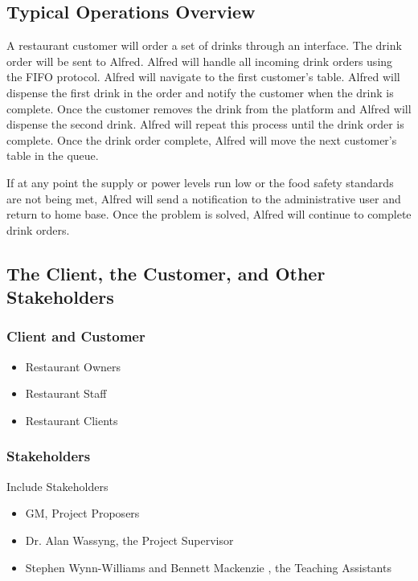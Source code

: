 \documentclass [11pt]{article}
\begin{document}
\subsection{Typical Operations Overview}
A restaurant customer will order a set of drinks through an interface. The drink order will be sent to Alfred. Alfred will handle all incoming drink orders using the FIFO protocol. Alfred will navigate to the first customer's table. Alfred will dispense the first drink in the order and notify the customer when the drink is complete. Once the customer removes the drink from the platform and Alfred will dispense the second drink. Alfred will repeat this process until the drink order is complete. Once the drink order complete, Alfred will move the next customer's table in the queue. \newline

If at any point the supply or power levels run low or the food safety standards are not being met, Alfred will send a notification to the administrative user and return to home base. Once the problem is solved, Alfred will continue to complete drink orders. 

\subsection{The Client, the Customer, and Other Stakeholders}

\subsubsection{Client and Customer}
	\begin{itemize}
	\item Restaurant Owners
	\item Restaurant Staff
	\item Restaurant Clients
\end{itemize} 

\subsubsection{Stakeholders}
 Include Stakeholders
		\begin{itemize}
 		\item GM, Project Proposers 
 		\item Dr. Alan Wassyng, the Project Supervisor
 		\item Stephen Wynn-Williams and Bennett Mackenzie , the Teaching Assistants
		\end{itemize} 
\end{document}
